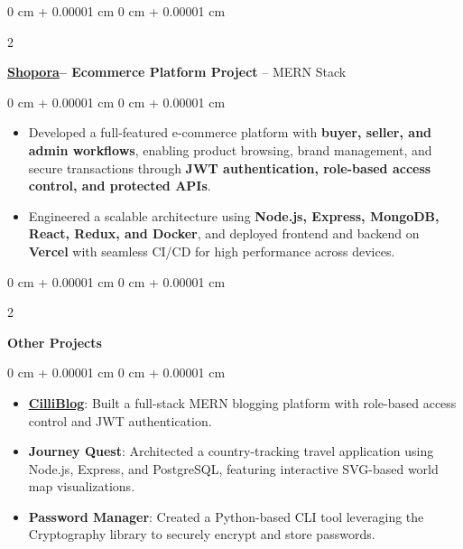 \documentclass[10pt, letterpaper]{article}
\newenvironment{highlights}{
    \begin{itemize}[
        topsep=0.10 cm,
        parsep=0.10 cm,
        partopsep=0pt,
        itemsep=0pt,
        leftmargin=0 cm + 10pt
    ]
}{
    \end{itemize}
} %
\newenvironment{onecolentry}{
    \begin{adjustwidth}{
        0 cm + 0.00001 cm
    }{
        0 cm + 0.00001 cm
    }
}{
    \end{adjustwidth}
} %
\newenvironment{twocolentry}[2][]{
    \onecolentry
    \def\secondColumn{#2}
    \setcolumnwidth{\fill, 4.5 cm}
    \begin{paracol}{2}
}{
    \switchcolumn \raggedleft \secondColumn
    \end{paracol}
    \endonecolentry
} %
\begin{document}
        \vspace{0.2 cm}
        \begin{twocolentry}{
    \href{https://github.com/ritheshan/Shopora}{\faGithub}
}
    \textbf{\href{https://mern-store-gold.vercel.app/}{\underline{\textcolor{blueHighlight}{\large Shopora}}}– Ecommerce Platform Project} -- MERN Stack
\end{twocolentry}

\vspace{0.10 cm}
\begin{onecolentry}
    \begin{highlights}
        \item Developed a full-featured e-commerce platform with \textbf{buyer, seller, and admin workflows}, enabling product browsing, brand management, and secure transactions through \textbf{JWT authentication, role-based access control, and protected APIs}.  
        \item Engineered a scalable architecture using \textbf{Node.js, Express, MongoDB, React, Redux, and Docker}, and deployed frontend and backend on \textbf{Vercel} with seamless CI/CD for high performance across devices.  
    \end{highlights}
\end{onecolentry}

        \begin{twocolentry}{
    \href{https://github.com/ritheshan}{\faGithub}
}
    \textbf {Other Projects}
\end{twocolentry}

\vspace{0.10 cm}
\begin{onecolentry}
    \begin{highlights}
        \item \textbf{\href{https://cilliblog.vercel.app/}{\underline{\textcolor{blueHighlight}{CilliBlog}}}}: Built a full-stack MERN blogging platform with role-based access control and JWT authentication. 
        \item \textbf{\textcolor{blueHighlight}{Journey Quest}}: Architected a country-tracking travel application using Node.js, Express, and PostgreSQL, featuring interactive SVG-based world map visualizations.
        \item \textbf{\textcolor{blueHighlight}{Password Manager}}: Created a Python-based CLI tool leveraging the Cryptography library to securely encrypt and store passwords.
    \end{highlights}
\end{onecolentry}
\end{document}
